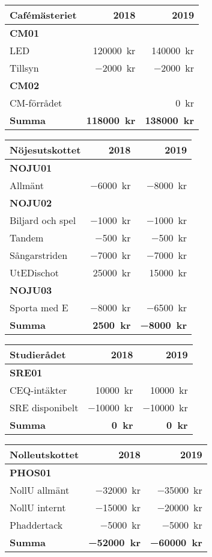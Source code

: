 \documentclass[../_main/handlingar.tex]{subfiles}
\begin{document}
\begin{tabularx}{10cm}{X r r}
    \textbf{\large Cafémästeriet} & \textbf{2018} & \textbf{2019} \\
    \hline
    \textbf{CM01} \\
    LED & \SI{120000}{kr} & \SI{140000}{kr} \\
    Tillsyn & \SI{-2000}{kr} & \SI{-2000}{kr} \\
    \textbf{CM02} \\
    CM-förrådet & & \SI{0}{kr} \\
    \hline
    \textbf{Summa} & \textbf{\SI{118000}{kr}} & \textbf{\SI{138000}{kr}} \\
\end{tabularx}

\begin{tabularx}{10cm}{X r r}
    \textbf{\large Nöjesutskottet} & \textbf{2018} & \textbf{2019} \\
    \hline
    \textbf{NOJU01} \\
    Allmänt & \SI{-6000}{kr} & \SI{-8000}{kr} \\
    \textbf{NOJU02} \\
    Biljard och spel & \SI{-1000}{kr} & \SI{-1000}{kr} \\
    Tandem & \SI{-500}{kr} & \SI{-500}{kr} \\
    Sångarstriden & \SI{-7000}{kr} & \SI{-7000}{kr} \\
    UtEDischot & \SI{25000}{kr} & \SI{15000}{kr} \\
    \textbf{NOJU03} \\
    Sporta med E & \SI{-8000}{kr} & \SI{-6500}{kr} \\
    \hline
    \textbf{Summa} & \textbf{\SI{2500}{kr}} & \textbf{\SI{-8000}{kr}} \\
\end{tabularx}

\begin{tabularx}{10cm}{X r r}
    \textbf{\large Studierådet} & \textbf{2018} & \textbf{2019} \\
    \hline
    \textbf{SRE01} \\
    CEQ-intäkter & \SI{10000}{kr} & \SI{10000}{kr} \\
    SRE disponibelt & \SI{-10000}{kr} & \SI{-10000}{kr} \\
    \hline
    \textbf{Summa} & \textbf{\SI{0}{kr}} & \textbf{\SI{0}{kr}} \\
\end{tabularx}

\begin{tabularx}{10cm}{X r r}
    \textbf{\large Nolleutskottet} & \textbf{2018} & \textbf{2019} \\
    \hline
    \textbf{PHOS01} \\
    NollU allmänt & \SI{-32000}{kr} & \SI{-35000}{kr} \\
    NollU internt & \SI{-15000}{kr} & \SI{-20000}{kr} \\
    Phaddertack & \SI{-5000}{kr} & \SI{-5000}{kr} \\
    \hline
    \textbf{Summa} & \textbf{\SI{-52000}{kr}} & \textbf{\SI{-60000}{kr}} \\
\end{tabularx}
\end{document}
